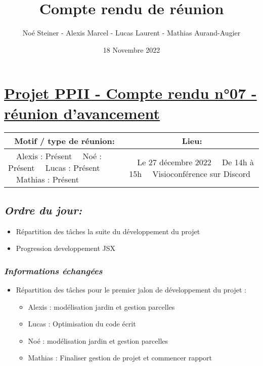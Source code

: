 \documentclass[french,a4paper]{article}
\author{Noé Steiner - Alexis Marcel - Lucas Laurent - Mathias Aurand-Augier}
\date{18 Novembre 2022}
\newcommand{\tabitem}{\textbullet~~}\title{Compte rendu de réunion}
\begin{document}
\maketitle

\section*{\underline{Projet PPII - Compte rendu n°07 - réunion d'avancement}}

\begin{table}[!htb]
  \centering
  \begin{tabular}{| p{7cm} | p{7cm} |}
    \hline
    \multicolumn{1}{|c|}{ Motif / type de réunion:} & \multicolumn{1}{c|}{Lieu:} \\
    \hline
    \tabitem Alexis : Présent\newline
    \tabitem Noé : Présent\newline
    \tabitem Lucas : Présent\newline
    \tabitem Mathias : Présent                      &
    \tabitem Le 27 décembre 2022\newline
    \tabitem De 14h à 15h\newline
    \tabitem Visioconférence sur Discord                                         \\
    \hline
  \end{tabular}
\end{table}

\subsection*{\textit{Ordre du jour:}}

\begin{itemize}
  \item Répartition des tâches la suite du développement du projet
  \item Progression developpement JSX
\end{itemize}

\subsubsection*{\textit{Informations échangées}}
\begin{itemize}
  \item Répartition des tâches pour le premier jalon de développement du projet :
    \begin{itemize}
      \item Alexis : modélisation jardin et gestion parcelles
      \item Lucas : Optimisation du code écrit
      \item Noé : modélisation jardin et gestion parcelles
      \item Mathias : Finaliser gestion de projet et commencer rapport
    \end{itemize}
\end{itemize}
\end{document}
